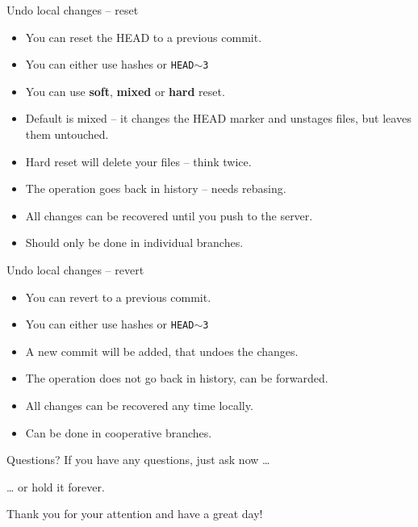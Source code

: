 \documentclass[14pt]{beamer}
\begin{document}
\begin{frame}{Undo local changes -- reset}
	\begin{itemize}
		\item You can reset the HEAD to a previous commit.
		\item You can either use hashes or \texttt{HEAD$\sim$3}
		\item You can use \textbf{soft}, \textbf{mixed} or \textbf{hard} reset.
		\item Default is mixed -- it changes the HEAD marker and unstages files, but leaves them untouched.
		\item Hard reset will delete your files -- think twice.
		\item The operation goes back in history -- needs rebasing.
		\item All changes can be recovered until you push to the server.
		\item Should only be done in individual branches.
	\end{itemize}
\end{frame}

\begin{frame}{Undo local changes -- revert}
	\begin{itemize}
		\item You can revert to a previous commit.
		\item You can either use hashes or \texttt{HEAD$\sim$3}
		\item A new commit will be added, that undoes the changes.
		\item The operation does not go back in history, can be forwarded.
		\item All changes can be recovered any time locally.
		\item Can be done in cooperative branches.
	\end{itemize}
\end{frame}

\begin{frame}{Questions?}
	If you have any questions, just ask now \ldots{}
	
	\vspace{15pt}
	
	\ldots{} or hold it forever.
\end{frame}

\begin{frame}{}
	Thank you for your attention and have a great day!
\end{frame}
\end{document}
